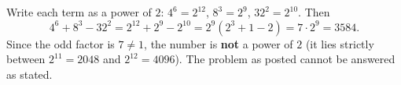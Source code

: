 Write each term as a power of $2$: $4^6=2^{12}$, $8^3=2^9$, $32^2=2^{10}$. Then
\[
4^6+8^3-32^2=2^{12}+2^9-2^{10}=2^9(2^3+1-2)=\boxed{7\cdot2^9}=3584 .
\]
Since the odd factor is $7\ne1$, the number is \textbf{not} a power of $2$ (it lies strictly between $2^{11}=2048$ and $2^{12}=4096$). The problem as posted cannot be answered as stated.
